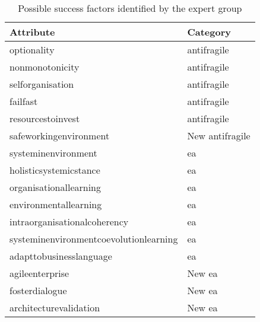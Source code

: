 \begin{longtable}{@{}ll@{}}
	\toprule%
	\textbf{Attribute} & \textbf{Category}  \\%
	\midrule%
	\endhead%
	\hline
	\endfoot%
	\caption[Possible success factors identified by the expert group]{Possible success factors identified by the expert group}
	\label{tab:expertgroupp2ossiblesf}
	\endlastfoot%
	\Gls{optionality} & \Gls{antifragile} \\%
	\Gls{nonmonotonicity} & \Gls{antifragile} \\%
	\Gls{selforganisation} & \Gls{antifragile} \\%
	\Gls{failfast} & \Gls{antifragile} \\%
	\Gls{resourcestoinvest} & \Gls{antifragile} \\%
	\Gls{safeworkingenvironment} & New \Gls{antifragile} \\%
	\Gls{systeminenvironment} & \acrlong{ea} \\%
	\Gls{holisticsystemicstance} & \acrlong{ea} \\%
	\Gls{organisationallearning} & \acrlong{ea} \\%
	\Gls{environmentallearning} & \acrlong{ea} \\%
	\Gls{intraorganisationalcoherency} & \acrlong{ea} \\%
	\Gls{systeminenvironmentcoevolutionlearning} & \acrlong{ea} \\%
	\Gls{adapttobusinesslanguage} & \acrlong{ea} \\%
	\Gls{agileenterprise} & New \acrlong{ea} \\%
	\Gls{fosterdialogue} & New \acrlong{ea} \\%
	\Gls{architecturevalidation} & New \acrlong{ea} \\%
	\bottomrule%
\end{longtable}%
